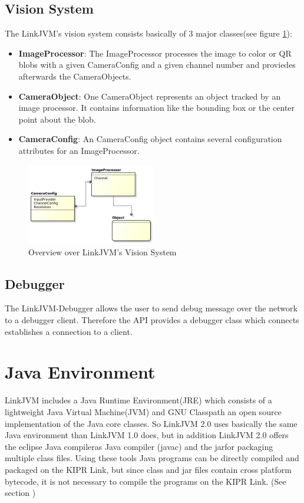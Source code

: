 \documentclass{juniorjournal}
\begin{document}
\subsection{Vision System}
The LinkJVM's vision system consists basically of 3 major classes(see figure \ref{fig:Vision-System}):
\begin{itemize}
	\item {\bf ImageProcessor}: The ImageProcessor processes the image to color or QR blobs with a given CameraConfig and a given channel number and proviedes afterwards the CameraObjects.
	\item {\bf CameraObject}: One CameraObject represents an object tracked by an image processor. It contains information like the bounding box or the center point about the blob.
	\item {\bf CameraConfig}: An CameraConfig object contains several configuration attributes for an ImageProcessor.
\end{itemize}
\begin{figure}[H]
\centering
\includegraphics[width=0.5\textwidth]{images/vision.pdf}
\caption{Overview over LinkJVM's Vision System}
\label{fig:Vision-System}
\end{figure}


\subsection{Debugger}
The LinkJVM-Debugger allows the user to send debug message over the network to a debugger client.
Therefore the API provides a debugger class which connects establishes a connection to a client.


\section{Java Environment}
LinkJVM includes a Java\cite{Java} Runtime Environment(JRE\cite{JRE}) which consists of a lightweight Java\cite{Java} Virtual Machine(JVM\cite{JVM}) and GNU Classpath\cite{GNU} an open source implementation of the Java\cite{Java} core classes.
So LinkJVM 2.0 uses basically the same Java\cite{Java} environment than LinkJVM 1.0\cite{linkjvm1.0} does, but in addition LinkJVM 2.0 offers the \frqq eclipse Java\cite{Java} compiler\flqq  as Java compiler (javac) and the \frqq jar\flqq  for packaging multiple class files.
Using these tools Java\cite{Java} programs can be directly compiled and packaged on the KIPR Link, but since class and jar files contain cross platform bytecode, it is not necessary to compile the programs on the KIPR Link. (See section )
\end{document}
